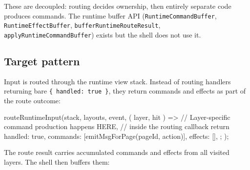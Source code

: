 These are decoupled: routing decides ownership, then entirely separate code produces commands. The runtime buffer API (\texttt{R\allowbreak{}u\allowbreak{}n\allowbreak{}t\allowbreak{}i\allowbreak{}m\allowbreak{}e\allowbreak{}C\allowbreak{}o\allowbreak{}m\allowbreak{}m\allowbreak{}a\allowbreak{}n\allowbreak{}d\allowbreak{}B\allowbreak{}u\allowbreak{}f\allowbreak{}f\allowbreak{}e\allowbreak{}r}, \texttt{R\allowbreak{}u\allowbreak{}n\allowbreak{}t\allowbreak{}i\allowbreak{}m\allowbreak{}e\allowbreak{}E\allowbreak{}f\allowbreak{}f\allowbreak{}e\allowbreak{}c\allowbreak{}t\allowbreak{}B\allowbreak{}u\allowbreak{}f\allowbreak{}f\allowbreak{}e\allowbreak{}r}, \texttt{b\allowbreak{}u\allowbreak{}f\allowbreak{}f\allowbreak{}e\allowbreak{}r\allowbreak{}R\allowbreak{}u\allowbreak{}n\allowbreak{}t\allowbreak{}i\allowbreak{}m\allowbreak{}e\allowbreak{}R\allowbreak{}o\allowbreak{}u\allowbreak{}t\allowbreak{}e\allowbreak{}R\allowbreak{}e\allowbreak{}s\allowbreak{}u\allowbreak{}l\allowbreak{}t}, \texttt{a\allowbreak{}p\allowbreak{}p\allowbreak{}l\allowbreak{}y\allowbreak{}R\allowbreak{}u\allowbreak{}n\allowbreak{}t\allowbreak{}i\allowbreak{}m\allowbreak{}e\allowbreak{}C\allowbreak{}o\allowbreak{}m\allowbreak{}m\allowbreak{}a\allowbreak{}n\allowbreak{}d\allowbreak{}B\allowbreak{}u\allowbreak{}f\allowbreak{}f\allowbreak{}e\allowbreak{}r}) exists but the shell does not use it.

\subsection{Target pattern}\label{record-155-target-pattern}

Input is routed through the runtime view stack. Instead of routing handlers returning bare \texttt{\{\allowbreak{} \allowbreak{}h\allowbreak{}a\allowbreak{}n\allowbreak{}d\allowbreak{}l\allowbreak{}e\allowbreak{}d\allowbreak{}:\allowbreak{} \allowbreak{}t\allowbreak{}r\allowbreak{}u\allowbreak{}e\allowbreak{} \allowbreak{}\}}, they return commands and effects as part of the route outcome:

\begin{CodeBlock}
routeRuntimeInput(stack, layouts, event, ({ layer, hit }) => {
  // Layer-specific command production happens HERE,
  // inside the routing callback
  return {
    handled: true,
    commands: [emitMsgForPage(pageId, action)],
    effects: [],
  };
});
\end{CodeBlock}

The route result carries accumulated commands and effects from all visited layers. The shell then buffers them:

